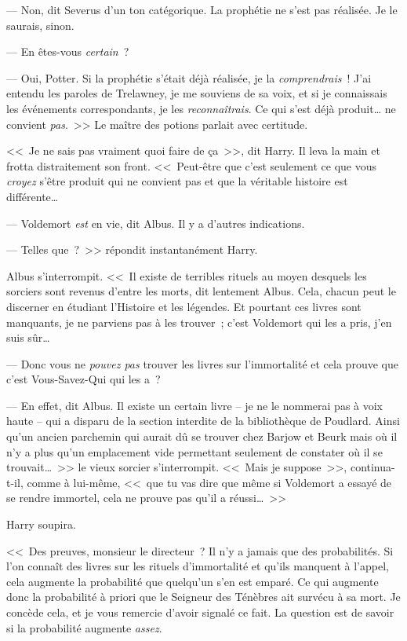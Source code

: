 --- Non, dit Severus d'un ton catégorique. La prophétie ne s'est pas réalisée. Je le saurais, sinon.

--- En êtes-vous \emph{certain}~?

--- Oui, Potter. Si la prophétie s'était déjà réalisée, je la \emph{comprendrais}~! J'ai entendu les paroles de Trelawney, je me souviens de sa voix, et si je connaissais les événements correspondants, je les \emph{reconnaîtrais}. Ce qui s'est déjà produit… ne convient \emph{pas}.~>> Le maître des potions parlait avec certitude.

<<~Je ne sais pas vraiment quoi faire de ça~>>, dit Harry. Il leva la main et frotta distraitement son front. <<~Peut-être que c'est seulement ce que vous \emph{croyez} s'être produit qui ne convient pas et que la véritable histoire est différente…

--- Voldemort \emph{est} en vie, dit Albus. Il y a d'autres indications.

--- Telles que~?~>> répondit instantanément Harry.

Albus s'interrompit. <<~Il existe de terribles rituels au moyen desquels les sorciers sont revenus d'entre les morts, dit lentement Albus. Cela, chacun peut le discerner en étudiant l'Histoire et les légendes. Et pourtant ces livres sont manquants, je ne parviens pas à les trouver~; c'est Voldemort qui les a pris, j'en suis sûr…

--- Donc vous ne \emph{pouvez pas} trouver les livres sur l'immortalité et cela prouve que c'est Vous-Savez-Qui qui les a~?

--- En effet, dit Albus. Il existe un certain livre -- je ne le nommerai pas à voix haute -- qui a disparu de la section interdite de la bibliothèque de Poudlard. Ainsi qu'un ancien parchemin qui aurait dû se trouver chez Barjow et Beurk mais où il n'y a plus qu'un emplacement vide permettant seulement de constater où il se trouvait…~>> le vieux sorcier s'interrompit. <<~Mais je suppose~>>, continua-t-il, comme à lui-même, <<~que tu vas dire que même si Voldemort a essayé de se rendre immortel, cela ne prouve pas qu'il a réussi…~>>

Harry soupira.

<<~Des preuves, monsieur le directeur~? Il n'y a jamais que des probabilités. Si l'on connaît des livres sur les rituels d'immortalité et qu'ils manquent à l'appel, cela augmente la probabilité que quelqu'un s'en est emparé. Ce qui augmente donc la probabilité à priori que le Seigneur des Ténèbres ait survécu à sa mort. Je concède cela, et je vous remercie d'avoir signalé ce fait. La question est de savoir si la probabilité augmente \emph{assez}.

